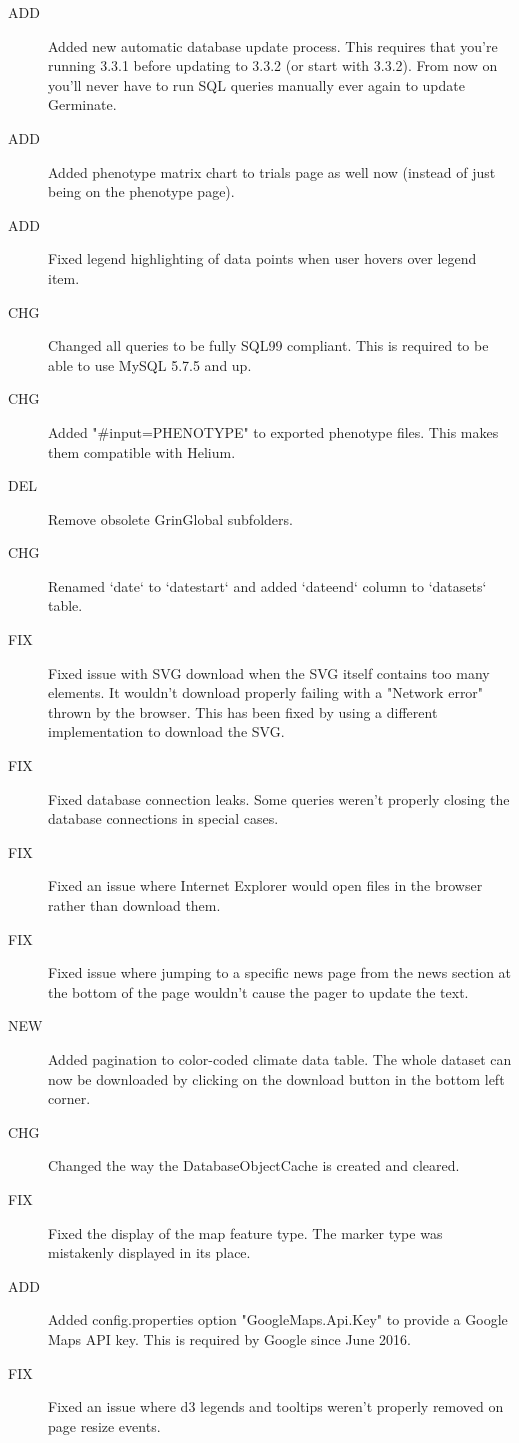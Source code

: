 \begin{description}
	\item[ADD]Added new automatic database update process. This requires that you're running 3.3.1 before updating to 3.3.2 (or start with 3.3.2). From now on you'll never have to run SQL queries manually ever again to update Germinate.
	\item[ADD]Added phenotype matrix chart to trials page as well now (instead of just being on the phenotype page).
	\item[ADD]Fixed legend highlighting of data points when user hovers over legend item.
	\item[CHG]Changed all queries to be fully SQL99 compliant. This is required to be able to use MySQL 5.7.5 and up.
	\item[CHG]Added "\#input=PHENOTYPE" to exported phenotype files. This makes them compatible with Helium.
	\item[DEL]Remove obsolete GrinGlobal subfolders.
	\item[CHG]Renamed `date` to `date\textunderscore start` and added `date\textunderscore end` column to `datasets` table.
	\item[FIX]Fixed issue with SVG download when the SVG itself contains too many elements. It wouldn't download properly failing with a "Network error" thrown by the browser. This has been fixed by using a different implementation to download the SVG.
	\item[FIX]Fixed database connection leaks. Some queries weren't properly closing the database connections in special cases.
	\item[FIX]Fixed an issue where Internet Explorer would open files in the browser rather than download them.
	\item[FIX]Fixed issue where jumping to a specific news page from the news section at the bottom of the page wouldn't cause the pager to update the text.
	\item[NEW]Added pagination to color-coded climate data table. The whole dataset can now be downloaded by clicking on the download button in the bottom left corner.
	\item[CHG]Changed the way the DatabaseObjectCache is created and cleared.
	\item[FIX]Fixed the display of the map feature type. The marker type was mistakenly displayed in its place.
	\item[ADD]Added config.properties option "GoogleMaps.Api.Key" to provide a Google Maps API key. This is required by Google since June 2016.
	\item[FIX]Fixed an issue where d3 legends and tooltips weren't properly removed on page resize events.

\end{description}
